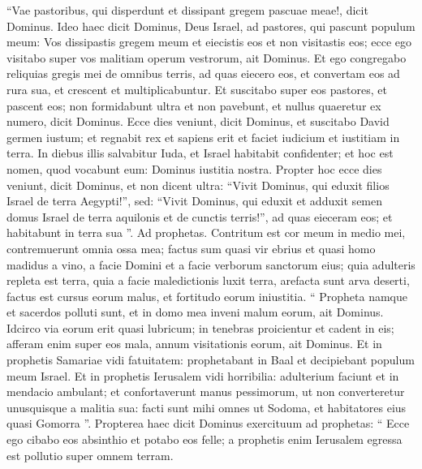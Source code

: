 \begin{biblechapter}
\begin{biblechapter}
\begin{biblechapter}
\begin{biblechapter}
\begin{biblechapter}
\begin{biblechapter}
\begin{biblechapter}
\begin{biblechapter}
\begin{biblechapter}
\begin{biblechapter}
\begin{biblechapter}
\begin{biblechapter}
\begin{biblechapter}
\begin{biblechapter}
\begin{biblechapter}
\begin{biblechapter}
\begin{biblechapter}
\begin{biblechapter}
\begin{biblechapter}
\begin{biblechapter}
\begin{biblechapter}
\begin{biblechapter}
\begin{biblechapter}
\verse “Vae pastoribus, qui disperdunt et dissipant gregem pascuae meae!, dicit Dominus. 
\verse Ideo haec dicit Dominus, Deus Israel, ad pastores, qui pascunt populum meum: Vos dissipastis gregem meum et eiecistis eos et non visitastis eos; ecce ego visitabo super vos malitiam operum vestrorum, ait Dominus. 
\verse Et ego congregabo reliquias gregis mei de omnibus terris, ad quas eiecero eos, et convertam eos ad rura sua, et crescent et multiplicabuntur. 
\verse Et suscitabo super eos pastores, et pascent eos; non formidabunt ultra et non pavebunt, et nullus quaeretur ex numero, dicit Dominus.
 \verse Ecce dies veniunt,
 dicit Dominus,
 et suscitabo David germen iustum;
 et regnabit rex et sapiens erit
 et faciet iudicium et iustitiam in terra.
 \verse In diebus illis salvabitur Iuda,
 et Israel habitabit confidenter;
 et hoc est nomen, quod vocabunt eum:
 Dominus iustitia nostra.
 \verse Propter hoc ecce dies veniunt, dicit Dominus, et non dicent ultra: “Vivit Dominus, qui eduxit filios Israel de terra Aegypti!”, 
\verse sed: “Vivit Dominus, qui eduxit et adduxit semen domus Israel de terra aquilonis et de cunctis terris!”, ad quas eieceram eos; et habitabunt in terra sua ”.
 \verse Ad prophetas.
 Contritum est cor meum in medio mei,
 contremuerunt omnia ossa mea;
 factus sum quasi vir ebrius
 et quasi homo madidus a vino,
 a facie Domini
 et a facie verborum sanctorum eius;
 \verse quia adulteris repleta est terra,
 quia a facie maledictionis luxit terra,
 arefacta sunt arva deserti,
 factus est cursus eorum malus,
 et fortitudo eorum iniustitia.
 \verse “ Propheta namque et sacerdos polluti sunt,
 et in domo mea inveni malum eorum,
 ait Dominus.
 \verse Idcirco via eorum erit quasi lubricum;
 in tenebras proicientur et cadent in eis;
 afferam enim super eos mala,
 annum visitationis eorum,
 ait Dominus.
 \verse Et in prophetis Samariae vidi fatuitatem:
 prophetabant in Baal
 et decipiebant populum meum Israel.
 \verse Et in prophetis Ierusalem vidi horribilia:
 adulterium faciunt et in mendacio ambulant;
 et confortaverunt manus pessimorum,
 ut non converteretur unusquisque a malitia sua:
 facti sunt mihi omnes ut Sodoma,
 et habitatores eius quasi Gomorra ”.
 \verse Propterea haec dicit Dominus exercituum ad prophetas:
 “ Ecce ego cibabo eos absinthio
 et potabo eos felle;
 a prophetis enim Ierusalem
 egressa est pollutio super omnem terram.

\end{biblechapter}
\end{biblechapter}
\end{biblechapter}
\end{biblechapter}
\end{biblechapter}
\end{biblechapter}
\end{biblechapter}
\end{biblechapter}
\end{biblechapter}
\end{biblechapter}
\end{biblechapter}
\end{biblechapter}
\end{biblechapter}
\end{biblechapter}
\end{biblechapter}
\end{biblechapter}
\end{biblechapter}
\end{biblechapter}
\end{biblechapter}
\end{biblechapter}
\end{biblechapter}
\end{biblechapter}
\end{biblechapter}
